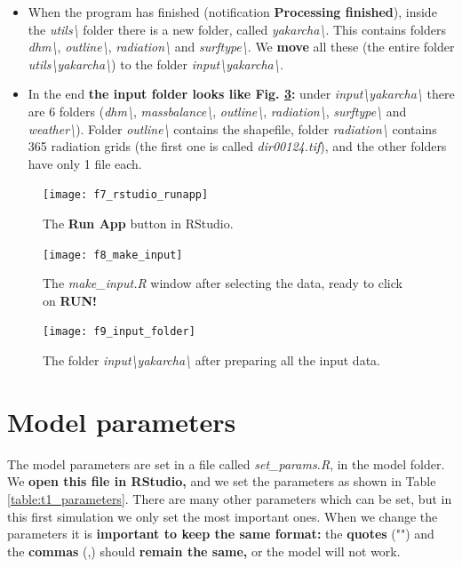 \documentclass[15pt]{extarticle}
\begin{document}
\begin{itemize}
    \item When the program has finished (notification \textbf{Processing finished}), inside the \textit{utils\textbackslash} folder there is a new folder, called \textit{yakarcha\textbackslash}. This contains folders \textit{dhm\textbackslash}, \textit{outline\textbackslash}, \textit{radiation\textbackslash} and \textit{surftype\textbackslash}. We \textbf{move} all these (the entire folder \textit{utils\textbackslash yakarcha\textbackslash}) to the folder \textit{input\nolinebreak\textbackslash\nolinebreak yakarcha\textbackslash.}
    \item In the end \textbf{the input folder looks like Fig. \ref{fig:f9_input_folder}:} under \textit{input\textbackslash yakarcha\textbackslash} there are 6 folders (\textit{dhm\textbackslash}, \textit{massbalance\textbackslash}, \textit{outline\textbackslash}, \textit{radiation\textbackslash}, \textit{surftype\textbackslash} and \textit{weather\textbackslash}). Folder \textit{outline\textbackslash} contains the shapefile, folder \textit{radiation\textbackslash} contains 365 radiation grids (the first one is called \textit{dir00124.tif}), and the other folders have only 1 file each.
\end{itemize}

\begin{figure}[h]
    \centering
    \texttt{[image: f7\_rstudio\_runapp]}
    \caption{The \textbf{Run App} button in RStudio.}
    \label{fig:f7_rstudio_runapp}
\end{figure}

\begin{figure}[h]
    \centering
    \texttt{[image: f8\_make\_input]}
    \caption{The \textit{make\_input.R} window after selecting the data, ready to click on \textbf{RUN!}}
    \label{fig:f8_make_input}
\end{figure}

\begin{figure}[h]
    \centering
    \texttt{[image: f9\_input\_folder]}
    \caption{The folder \textit{input\textbackslash yakarcha\textbackslash} after preparing all the input data.}
    \label{fig:f9_input_folder}
\end{figure}

\clearpage
\section{Model parameters}
The model parameters are set in a file called \textit{set\_params.R}, in the model folder. We \textbf{open this file in RStudio,} and we set the parameters as shown in Table \ref{table:t1_parameters}. There are many other parameters which can be set, but in this first simulation we only set the most important ones. When we change the parameters it is \textbf{important to keep the same format:} the \textbf{quotes} ("") and the \textbf{commas} (,) should \textbf{remain the same,} or the model will not work.
\end{document}

